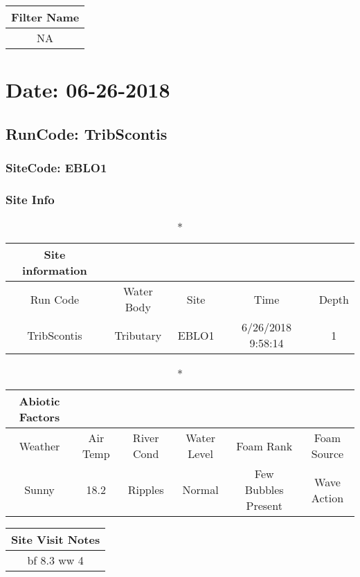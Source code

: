 \documentclass[
  letterpaper,
  DIV=11,
  numbers=noendperiod]{scrartcl}
\begin{document}
\begin{longtable*}{c}
\toprule
Filter Name \\ 
\midrule\addlinespace[2.5pt]
NA \\ 
\bottomrule
\end{longtable*}

\hypertarget{date-06-26-2018-9}{%
\section{Date: 06-26-2018}\label{date-06-26-2018-9}}

\hypertarget{runcode-tribscontis-9}{%
\subsection{RunCode: TribScontis}\label{runcode-tribscontis-9}}

\hypertarget{sitecode-eblo1}{%
\subsubsection{SiteCode: EBLO1}\label{sitecode-eblo1}}

\subsubsection{Site Info}

\begin{longtable*}{ccccc}
\caption*{
{\large Site information}
} \\ 
\toprule
Run Code & Water Body & Site & Time & Depth \\ 
\midrule\addlinespace[2.5pt]
TribScontis & Tributary & EBLO1 & 6/26/2018 9:58:14 & 1 \\ 
\bottomrule
\end{longtable*}

\begin{longtable*}{cccccc}
\caption*{
{\large Abiotic Factors}
} \\ 
\toprule
Weather & Air Temp & River Cond & Water Level & Foam Rank & Foam Source \\ 
\midrule\addlinespace[2.5pt]
Sunny & 18.2 & Ripples & Normal & Few Bubbles Present & Wave Action \\ 
\bottomrule
\end{longtable*}

\begin{longtable*}{c}
\toprule
Site Visit Notes \\ 
\midrule\addlinespace[2.5pt]
bf 8.3
ww 4 \\ 
\bottomrule
\end{longtable*}
\end{document}
